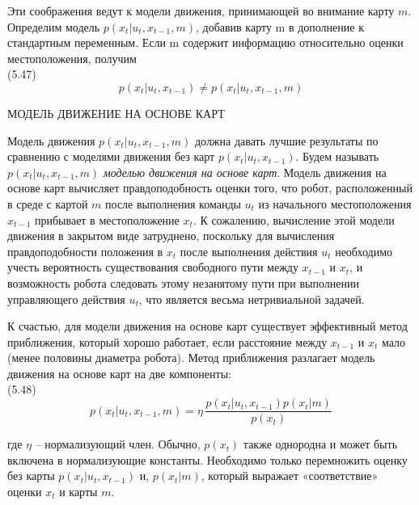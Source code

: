 \documentclass[10pt,a4paper]{article}
\begin{document}
Эти соображения ведут к модели движения, принимающей во внимание карту $m$. Определим модель $p(x_t | u_t, x_{t-1}, m)$, добавив карту m в дополнение к стандартным переменным. Если m содержит информацию относительно оценки местоположения, получим\\

(5.47)
$$p(x_t|u_t,x_{t-1})\neq p(x_t|u_t,x_{t-1},m)$$

МОДЕЛЬ ДВИЖЕНИЕ НА ОСНОВЕ КАРТ

Модель движения $p(x_t | u_t, x_{t-1}, m)$ должна давать лучшие результаты по сравнению с моделями движения без карт $p(x_t | u_t, x_{t-1})$. Будем называть $p(x_t | u_t, x_{t-1}, m)$ \textit{моделью движения на основе карт}. Модель движения на основе карт вычисляет правдоподобность оценки того, что робот, расположенный в среде с картой $m$ после выполнения команды $u_t$ из начального местоположения $x_{t-1}$ прибывает в местоположение $x_t$. К сожалению, вычисление этой модели движения в закрытом виде затруднено, поскольку для вычисления правдоподобности положения в $x_t$ после выполнения действия $u_t$ необходимо учесть вероятность существования свободного пути между $x_{t-1}$ и $x_t$, и возможность робота следовать этому незанятому пути при выполнении управляющего действия $u_t$, что является весьма нетривиальной задачей.

К счастью, для модели движения на основе карт существует эффективный метод  приближения, который хорошо работает, если расстояние между $x_{t-1}$ и $x_t$ мало (менее половины диаметра робота). Метод приближения разлагает модель движения на основе карт на две компоненты:\\

(5.48)
$$p(x_t|u_t,x_{t-1},m)=\eta\,\frac{p(x_t|u_t,x_{t-1})p(x_t|m)}{p(x_t)}$$

где $\eta$ – нормализующий член. Обычно, $p(x_t)$ также однородна и может быть включена в нормализующие константы. Необходимо только перемножить оценку без карты $p(x_t | u_t, x_{t-1})$ и, $p(x_t | m)$, который выражает «соответствие» оценки $x_t$ и карты $m$. \\
\end{document}
